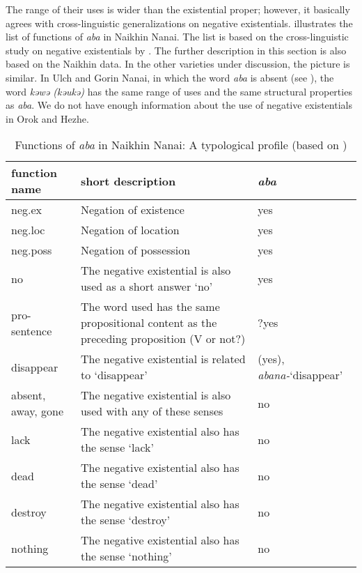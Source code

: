 \documentclass[output=paper,colorlinks,citecolor=brown]{langscibook}
\begin{document}
The range of their uses is wider than the existential proper; however, it basically agrees with cross-linguistic generalizations on negative existentials.  illustrates the list of functions of \textit{aba} in Naikhin Nanai. The list is based on the cross-linguistic study on negative existentials by \citet{Veselinova2013}. The further description in this section is also based on the Naikhin data. In the other varieties under discussion, the picture is similar. In Ulch and Gorin Nanai, in which the word \textit{aba} is absent (see ), the word \textit{kəwə (kəukə)} has the same range of uses and the same structural properties as \textit{aba}. We do not have enough information about the use of negative existentials in Orok and Hezhe.

\begin{table}
\small
    \caption{Functions of \textit{aba} in Naikhin Nanai: A typological profile (based on \citealp[118--119]{Veselinova2013})}
    \label{tab:T3}
    \begin{tabularx}{\textwidth}{p{3cm}Qp{2cm}}
        \lsptoprule
        function name & short description & \textit{aba} \\
        \midrule
        neg.ex & Negation of existence & yes \\
        neg.loc & Negation of location & yes \\
        neg.poss & Negation of possession & yes \\
        no & The negative existential is also used as a short answer ‘no’ & yes \\
        pro-sentence & The word used has the same propositional content as the preceding proposition (V or not?) & ?yes \\
        disappear & The negative existential is related to ‘disappear’ & (yes), \textit{abana-}\newline `disappear'\\
        absent, away, gone & The negative existential is also used with any of these senses & no \\
        lack & The negative existential also has the sense ‘lack’ & no \\
        dead & The negative existential also has the sense ‘dead’ & no \\
        destroy & The negative existential also has the sense ‘destroy’ & no \\
        nothing & The negative existential also has the sense ‘nothing’ & no \\

\end{tabularx}
\end{table}
\end{document}
